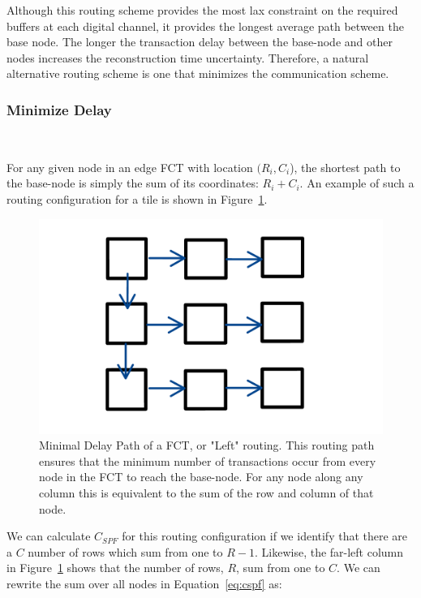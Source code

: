 Although this routing scheme provides the most lax constraint on the required buffers at each digital channel, it provides the longest average path between the base node.
The longer the transaction delay between the base-node and other nodes increases the reconstruction time uncertainty.
Therefore, a natural alternative routing scheme is one that minimizes the communication scheme.

\subsubsection{Minimize Delay}~\label{sec:min_comm}

For any given node in an edge FCT with location $(R_{i},C_{i}$), the shortest path to the base-node is simply the sum of its coordinates: $R_{i}+C_{i}$.
An example of such a routing configuration for a tile is shown in Figure~\ref{fig:leftroute}.

\begin{figure}[]
\centering
\includegraphics[width=\textwidth]{images/leftroute.pdf}
\caption{Minimal Delay Path of a FCT, or "Left" routing.
This routing path ensures that the minimum number of transactions occur from every node in the FCT to reach the base-node.
For any node along any column this is equivalent to the sum of the row and column of that node.}
\label{fig:leftroute}
\end{figure}

We can calculate $C_{SPF}$ for this routing configuration if we identify that there are a $C$ number of rows which sum from one to $R-1$.
Likewise, the far-left column in Figure~\ref{fig:leftroute} shows that the number of rows, $R$, sum from one to $C$.
We can rewrite the sum over all nodes in Equation~\ref{eq:cspf} as:

